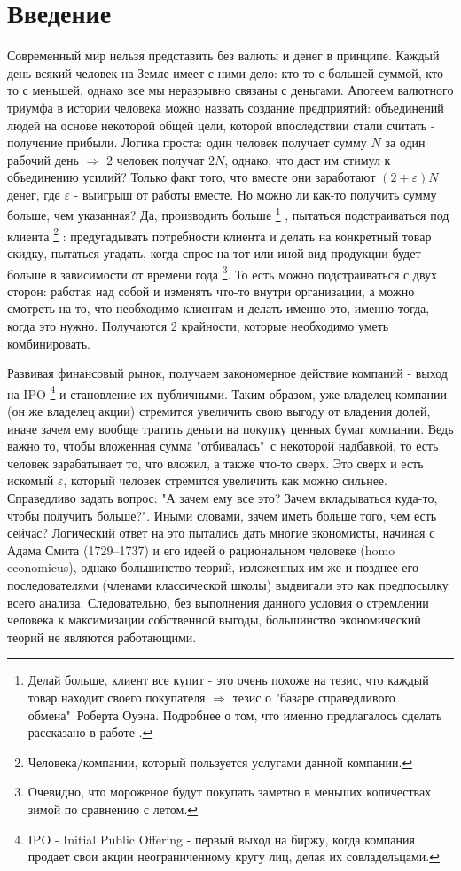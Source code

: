 \section{Введение} 
	Современный мир нельзя представить без валюты и денег в принципе. Каждый день всякий человек на Земле имеет с ними дело: кто-то с большей суммой, кто-то с меньшей, однако все мы неразрывно связаны с деньгами. Апогеем валютного триумфа в истории человека можно назвать создание предприятий: объединений людей на основе некоторой общей цели, которой впоследствии стали считать - получение прибыли. Логика проста: один человек получает сумму $N$ за один рабочий день $\Rightarrow$ 2 человек получат $2N$, однако, что даст им стимул к объединению усилий? Только факт того, что вместе они заработают $(2 + \varepsilon)N$ денег, где $\varepsilon$ - выигрыш от работы вместе. Но можно ли как-то получить сумму больше, чем указанная? Да, производить больше \footnote{Делай больше, клиент все купит - это очень похоже на тезис, что каждый товар находит своего покупателя $\Rightarrow$ тезис о "базаре справедливого обмена"\ Роберта Оуэна. Подробнее о том, что именно предлагалось сделать рассказано в работе \cite{ropert_ouwen}.} , пытаться подстраиваться под клиента \footnote{Человека/компании, который пользуется услугами данной компании.} : предугадывать потребности клиента и делать на конкретный товар скидку, пытаться угадать, когда спрос на тот или иной вид продукции будет больше в зависимости от времени года \footnote{Очевидно, что мороженое будут покупать заметно в меньших количествах зимой по сравнению с летом.}. То есть можно подстраиваться с двух сторон: работая над собой и изменять что-то внутри организации, а можно смотреть на то, что необходимо клиентам и делать именно это, именно тогда, когда это нужно. Получаются 2 крайности, которые необходимо уметь комбинировать. 
	
	Развивая финансовый рынок, получаем закономерное действие компаний - выход на IPO \footnote{IPO - Initial Public Offering - первый выход на биржу, когда компания продает свои акции неограниченному кругу лиц, делая их совладельцами.} и становление их публичными. Таким образом, уже владелец компании (он же владелец акции) стремится увеличить свою выгоду от владения долей, иначе зачем ему вообще тратить деньги на покупку ценных бумаг компании. Ведь важно то, чтобы вложенная сумма "отбивалась"\ с некоторой надбавкой, то есть человек зарабатывает то, что вложил, а также что-то сверх. Это сверх и есть искомый $\varepsilon$, который человек стремится увеличить как можно сильнее. Справедливо задать вопрос: "А зачем ему все это? Зачем вкладываться куда-то, чтобы получить больше?". Иными словами, зачем иметь больше того, чем есть сейчас? Логический ответ на это пытались дать многие экономисты, начиная с Адама Смита (1729–1737) \cite{adam_smith} и его идеей о рациональном человеке (homo economicus), однако большинство теорий, изложенных им же и позднее его последователями (членами классической школы) выдвигали это как предпосылку всего анализа. Следовательно, без выполнения данного условия о стремлении человека к максимизации собственной выгоды, большинство экономический теорий не являются работающими.
	
